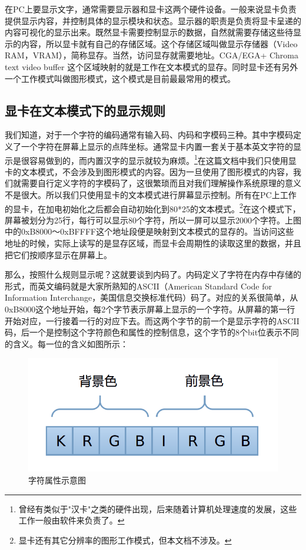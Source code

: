 \par 在PC上要显示文字，通常需要显示器和显卡这两个硬件设备。一般来说显卡负责提供显示内容，并控制具体的显示模块和状态。显示器的职责是负责将显卡呈递的内容可视化的显示出来。既然显卡需要控制显示的数据，自然就需要存储这些待显示的内容，所以显卡就有自己的存储区域。这个存储区域叫做显示存储器（Video RAM，VRAM），简称显存。当然，访问显存就需要地址。CGA/EGA+ Chroma text video buffer 这个区域映射的就是工作在文本模式的显存。同时显卡还有另外一个工作模式叫做图形模式，这个模式是目前最最常用的模式。

\subsection{显卡在文本模式下的显示规则}

\par 我们知道，对于一个字符的编码通常有输入码、内码和字模码三种。其中字模码定义了一个字符在屏幕上显示的点阵坐标。通常显卡内置一套关于基本英文字符的显示是很容易做到的，而内置汉字的显示就较为麻烦。\footnote{曾经有类似于"汉卡"之类的硬件出现，后来随着计算机处理速度的发展，这些工作一般由软件来负责了。}在这篇文档中我们只使用显卡的文本模式，不会涉及到图形模式的内容。因为一旦使用了图形模式的内容，我们就需要自行定义字符的字模码了，这很繁琐而且对我们理解操作系统原理的意义不是很大。所以我们只使用显卡的文本模式进行屏幕显示控制。所有在PC上工作的显卡，在加电初始化之后都会自动初始化到80*25的文本模式。\footnote{显卡还有其它分辨率的图形工作模式，但本文档不涉及。}在这个模式下，屏幕被划分为25行，每行可以显示80个字符，所以一屏可以显示2000个字符。上图中的0xB8000～0xBFFFF这个地址段便是映射到文本模式的显存的。当访问这些地址的时候，实际上读写的是显存区域，而显卡会周期性的读取这里的数据，并且把它们按顺序显示在屏幕上。

\par 那么，按照什么规则显示呢？这就要谈到内码了。内码定义了字符在内存中存储的形式，而英文编码就是大家所熟知的ASCII（American Standard Code for Information Interchange，美国信息交换标准代码）码了。对应的关系很简单，从0xB8000这个地址开始，每2个字节表示屏幕上显示的一个字符。从屏幕的第一行开始对应，一行接着一行的对应下去。而这两个字节的前一个是显示字符的ASCII码，后一个是控制这个字符颜色和属性的控制信息，这个字节的8个bit位表示不同的含义。每一位的含义如图所示：

\begin{figure}[ht]
      \centering
      \includegraphics[scale=0.25]{picture/chapt4/char_color.png}
      \caption{字符属性示意图}
\end{figure}

